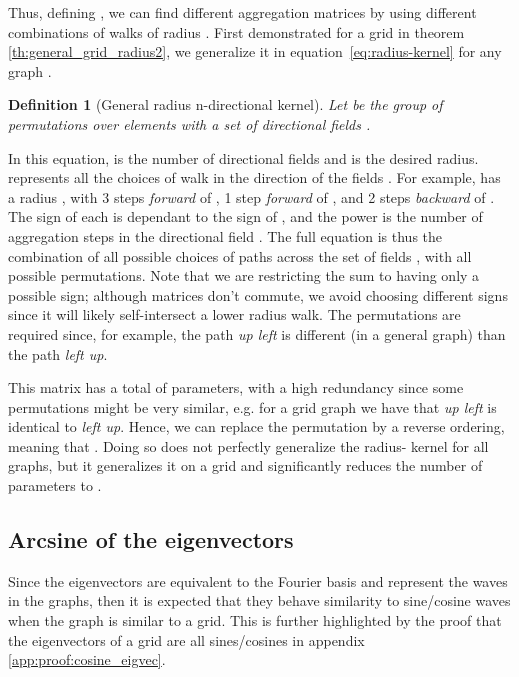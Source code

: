 \documentclass{article} \usepackage{arxiv,times}
\def\eqref#1{equation~\ref{#1}}
\newtheorem{definition}{Definition}
\begin{document}
Thus, defining , we can find different aggregation matrices by using different combinations of walks of radius . First demonstrated for a grid in theorem \ref{th:general_grid_radius2}, we generalize it in \eqref{eq:radius-kernel} for any graph .

\begin{definition}[General radius  n-directional kernel]
\label{def:radius}
Let  be the group of permutations over  elements with a set of directional fields .

\end{definition}

In this equation,  is the number of directional fields and  is the desired radius.  represents all the choices of walk  in the direction of the fields . For example,  has a radius , with 3 steps \textit{forward} of , 1 step \textit{forward} of , and 2 steps \textit{backward} of . The sign of each  is dependant to the sign of , and the power  is the number of aggregation steps in the directional field . The full equation is thus the combination of all possible choices of paths across the set of fields , with all possible permutations. Note that we are restricting the sum to  having only a possible sign; although matrices don't commute, we avoid choosing different signs since it will likely self-intersect a lower radius walk. The permutations  are required since, for example, the path \textit{up  left} is different (in a general graph) than the path \textit{left  up}.

This matrix  has a total of  parameters, with a high redundancy since some permutations might be very similar, e.g. for a grid graph we have that \textit{up  left} is identical to \textit{left  up}. Hence, we can replace the permutation  by a reverse ordering, meaning that . Doing so does not perfectly generalize the radius- kernel for all graphs, but it generalizes it on a grid and significantly reduces the number of parameters to .


\subsection{Arcsine of the eigenvectors}
Since the eigenvectors  are equivalent to the Fourier basis and represent the waves in the graphs, then it is expected that they behave similarity to sine/cosine waves when the graph is similar to a grid. This is further highlighted by the proof that the eigenvectors of a grid are all sines/cosines in appendix \ref{app:proof:cosine_eigvec}.
\end{document}
